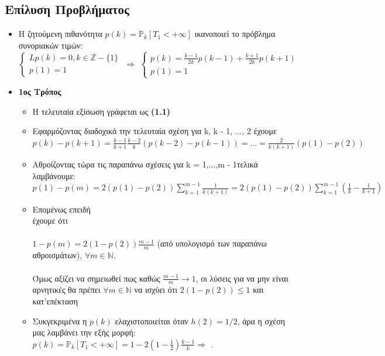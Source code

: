 \documentclass[a4paper,oneside, 11pt]{article}
\begin{document}
\subsection*{Επίλυση Προβλήματος}
\begingroup
\begin{itemize}
	\item  Η ζητούμενη πιθανότητα $p(k) = \mathbb{P}_k[ T_1 < + \infty]$ ικανοποιεί το πρόβλημα συνοριακών τιμών: \\
	$\begin{cases}
	Lp(k) = 0, k \in \mathbb{Z} - \{1\} \\
	p(1) = 1
	\end{cases}$
	$\Rightarrow$
	$\begin{cases}
	p(k) = \frac{k-1}{2k}p(k-1) + \frac{k+1}{2k}p(k+1) \\
	p(1) = 1
	\end{cases}$
	
	\item \textbf{1ος Τρόπος}
	\begin{itemize}
		\item Η τελευταία εξίσωση γράφεται ως  \textbf{(1.1)}
		\item Εφαρμόζοντας διαδοχικά την τελευταία σχέση για k, k - 1, ..., 2 έχουμε $p(k) - p(k+1) = \frac{k-1}{k+1}\frac{k-2}{k}(p(k-2) - p(k-1))= ... = \frac{2}{k(k+1)}(p(1) - p(2))$
		\item Αθροίζοντας τώρα τις παραπάνω σχέσεις για k = 1,...,m - 1τελικά λαμβάνουμε: \\ 
		$p(1) - p(m) = 2(p(1) - p(2)) \sum_{k=1}^{m - 1}\frac{1}{k(k+1)} = 2(p(1) - p(2)) \sum_{k=1}^{m - 1}(\frac{1}{k} - \frac{1}{k+1} )$
		\item Επομένως επειδή \\
		 έχουμε ότι \\ \\ 
		$1 - p(m) = 2(1 - p(2)) \frac{m - 1}{m}$ (από υπολογισμό των παραπάνω αθροισμάτων), $\forall m \in \mathbb{N}$. \\ \\
		Όμως αξίζει να σημειωθεί πως καθώς $\frac{m - 1}{m} \rightarrow 1$, οι λύσεις για να μην είναι αρνητικές θα πρέπει $\forall m \in \mathbb{N} $ να ισχύει ότι $2(1 - p(2)) \leq 1$ και κατ'επέκταση 
		\item Συκγεκριμένα η $p(k)$ ελαχιστοποιείται όταν $h(2) = 1/2$, άρα η σχέση μας λαμβάνει την εξής μορφή: \\
		$p(k) = \mathbb{P}_k[ T_{1} < + \infty] = 1 - 2 ( 1 - \frac{1}{2})\frac{k-1}{k} \Rightarrow$ . 
	\end{itemize}
	

\end{itemize}
\end{document}
